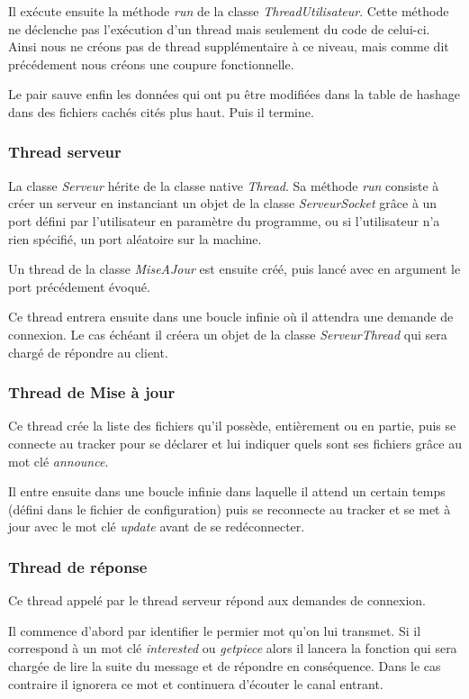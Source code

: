 Il exécute ensuite la méthode \textit{run} de la classe
\textit{ThreadUtilisateur}.  Cette méthode ne déclenche pas
l'exécution d'un thread mais seulement du code de celui-ci. Ainsi nous
ne créons pas de thread supplémentaire à ce niveau, mais comme dit
précédement nous créons une coupure fonctionnelle.

Le pair sauve enfin les données qui ont pu être modifiées dans la table
de hashage dans des fichiers cachés cités plus haut. Puis il termine.

\subsubsection{Thread serveur}
La classe \textit{Serveur} hérite de la classe native \textit{Thread}.
Sa méthode \textit{run} consiste à créer un serveur en instanciant un
objet de la classe \textit{ServeurSocket} grâce à un port défini par
l'utilisateur en paramètre du programme, ou si l'utilisateur n'a rien
spécifié, un port aléatoire sur la machine.


Un thread de la classe \textit{MiseAJour} est ensuite créé, puis lancé avec en
argument le port précédement évoqué.

Ce thread entrera ensuite dans une boucle infinie où il attendra une
demande de connexion. Le cas échéant il créera un objet de la classe
\textit{ServeurThread} qui sera chargé de répondre au client.


\subsubsection{Thread de Mise à jour}
Ce thread crée la liste des fichiers qu'il possède, entièrement ou en
partie, puis se connecte au tracker pour se déclarer et lui indiquer
quels sont ses fichiers grâce au mot clé \textit{announce}.

Il entre ensuite dans une boucle infinie dans laquelle il attend un
certain temps (défini dans le fichier de configuration) puis se
reconnecte au tracker et se met à jour avec le mot clé \textit{update}
avant de se redéconnecter.


\subsubsection{Thread de réponse}
Ce thread appelé par le thread serveur répond aux demandes de
connexion.

Il commence d'abord par identifier le permier mot qu'on lui
transmet. Si il correspond à un mot clé \textit{interested} ou
\textit{getpiece} alors il lancera la fonction qui sera chargée de lire
la suite du message et de répondre en conséquence. Dans le cas
contraire il ignorera ce mot et continuera d'écouter le canal entrant.

